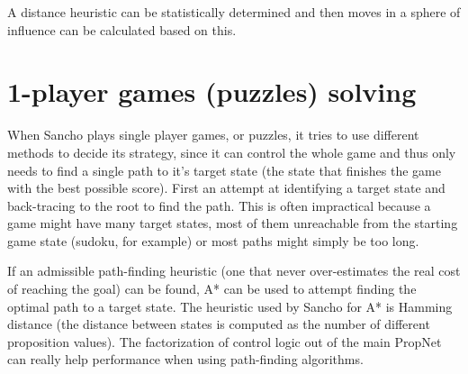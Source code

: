 A distance heuristic can be statistically determined and then moves in a sphere of influence can be calculated based on this. 
\fi


\section{1-player games (puzzles) solving}

When Sancho plays single player games, or puzzles, it tries to use different methods to decide its strategy, since it can control the whole game and thus only needs to find a single path to it's target state (the state that finishes the game with the best possible score).
First an attempt at identifying a target state and back-tracing to the root to find the path. This is often impractical because a game might have many target states, most of them unreachable from the starting game state (sudoku, for example) or most paths might simply be too long.

If an admissible path-finding heuristic (one that never over-estimates the real cost of reaching the goal) can be found, A* can be used to attempt finding the optimal path to a target state. The heuristic used by Sancho for A* is Hamming distance (the distance between states is computed as the number of different proposition values).
The factorization of control logic out of the main PropNet can really help performance when using path-finding algorithms.

